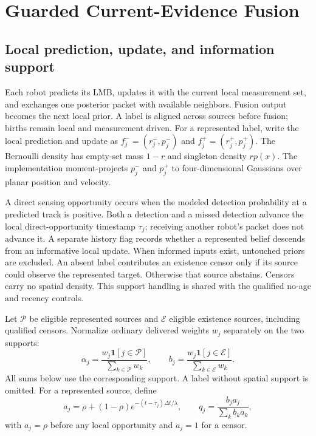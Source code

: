 \section{Guarded Current-Evidence Fusion}
\subsection{Local prediction, update, and information support}
Each robot predicts its LMB, updates it with the current local measurement
set, and exchanges one posterior packet with available neighbors. Fusion
output becomes the next local prior. A label is aligned across sources
before fusion; births remain local and measurement driven.
For a represented label, write the local prediction and update as
$f_j^-=(r_j^-,p_j^-)$ and $f_j^+=(r_j^+,p_j^+)$.
The Bernoulli density has empty-set mass $1-r$ and singleton density $rp(x)$.
The implementation moment-projects $p_j^-$ and $p_j^+$ to four-dimensional
Gaussians over planar position and velocity.

A direct sensing opportunity occurs when the modeled detection
probability at a predicted track is positive. Both a detection and a
missed detection advance the local direct-opportunity timestamp $\tau_j$;
receiving another robot's packet does not advance it. A separate history
flag records whether a represented belief descends from an informative
local update. When informed inputs exist, untouched priors are excluded.
An absent label contributes an existence censor only if its source could
observe the represented target. Otherwise that source abstains. Censors
carry no spatial density. This support handling is shared with the
qualified no-age and recency controls.

Let $\mathcal P$ be eligible represented sources and $\mathcal E$ eligible
existence sources, including qualified censors. Normalize ordinary
delivered weights $w_j$ separately on the two supports:
\begin{equation}
 \alpha_j=\frac{w_j\mathbf1[j\in\mathcal P]}{\sum_{k\in\mathcal P}w_k},
 \qquad
 b_j=\frac{w_j\mathbf1[j\in\mathcal E]}{\sum_{k\in\mathcal E}w_k}.
 \label{eq:ordinary}
\end{equation}
All sums below use the corresponding support. A label without spatial
support is omitted. For a represented source, define
\begin{equation}
 a_j=\rho+(1-\rho)e^{-(t-\tau_j)\Delta t/\lambda},
 \qquad q_j=\frac{b_j a_j}{\sum_k b_k a_k},
 \label{eq:age}
\end{equation}
with $a_j=\rho$ before any local opportunity and $a_j=1$ for a censor.

